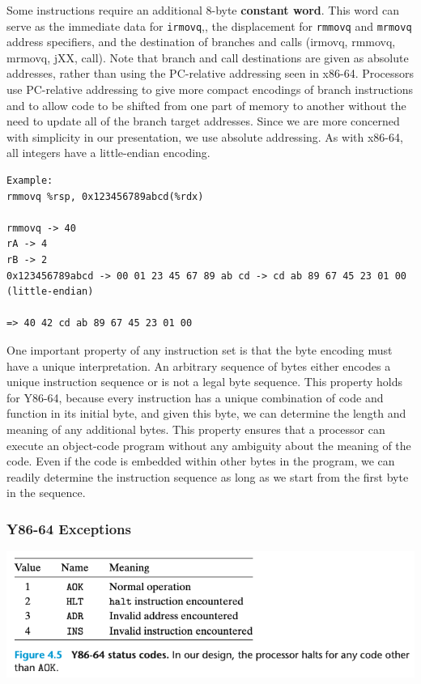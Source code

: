 \documentclass[11pt]{article}
\begin{document}
Some instructions require an additional 8-byte \textbf{constant word}. This word can serve as the immediate data for \texttt{irmovq},, the displacement for \texttt{rmmovq} and \texttt{mrmovq} address specifiers, and the destination of branches and calls (irmovq, rmmovq, mrmovq, jXX, call). Note that branch and call destinations are given as absolute addresses, rather than using the PC-relative addressing seen in x86-64. Processors use PC-relative addressing to give more compact encodings of branch instructions and to allow code to be shifted from one part of memory to another without the need to update all of the branch target addresses. Since we are more concerned with simplicity in our presentation, we use absolute addressing. As with x86-64, all integers have a little-endian encoding.\\



\begin{verbatim}
Example:
rmmovq %rsp, 0x123456789abcd(%rdx)

rmmovq -> 40
rA -> 4
rB -> 2
0x123456789abcd -> 00 01 23 45 67 89 ab cd -> cd ab 89 67 45 23 01 00 (little-endian)

=> 40 42 cd ab 89 67 45 23 01 00
\end{verbatim}


One important property of any instruction set is that the byte encoding must have a unique interpretation. An arbitrary sequence of bytes either encodes a unique instruction sequence or is not a legal byte sequence. This property holds for Y86-64, because every instruction has a unique combination of code and function in its initial byte, and given this byte, we can determine the length and meaning of any additional bytes. This property ensures that a processor can execute an object-code program without any ambiguity about the meaning of the code. Even if the code is embedded within other bytes in the program, we can readily determine the instruction sequence as long as we start from the first byte in the sequence.\\

\subsubsection{Y86-64 Exceptions}
\label{sec:org649ec07}

\begin{center}
\includegraphics[width=.9\linewidth]{pics/figure4.5-y86-64-status-codes.png}
\end{center}
\end{document}
